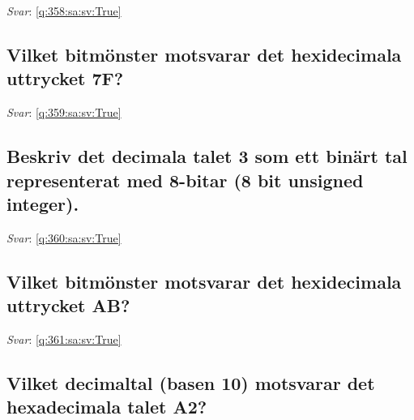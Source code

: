\documentclass[a4paper,11pt,oneside]{article}
\begin{document}
\begin{sloppypar}
\noindent\makebox[\textwidth]{\hrulefill}

\vspace{1cm}

\textit{Svar}: \autoref{q:358:sa:sv:True}



\subsection{Vilket bitm\"onster motsvarar det hexidecimala uttrycket 7F?}

\label{q:359:sa:sv:False}

\vspace{2cm}

\noindent\makebox[\textwidth]{\hrulefill}

\vspace{1cm}

\textit{Svar}: \autoref{q:359:sa:sv:True}



\subsection{Beskriv det decimala talet 3 som ett bin\"art tal representerat med 8-bitar (8 bit unsigned integer).}

\label{q:360:sa:sv:False}

\vspace{2cm}

\noindent\makebox[\textwidth]{\hrulefill}

\vspace{1cm}

\textit{Svar}: \autoref{q:360:sa:sv:True}



\subsection{Vilket bitm\"onster motsvarar det hexidecimala uttrycket AB?}

\label{q:361:sa:sv:False}

\vspace{2cm}

\noindent\makebox[\textwidth]{\hrulefill}

\vspace{1cm}

\textit{Svar}: \autoref{q:361:sa:sv:True}



\subsection{Vilket decimaltal (basen 10) motsvarar det hexadecimala talet A2?}


\end{sloppypar}
\end{document}

